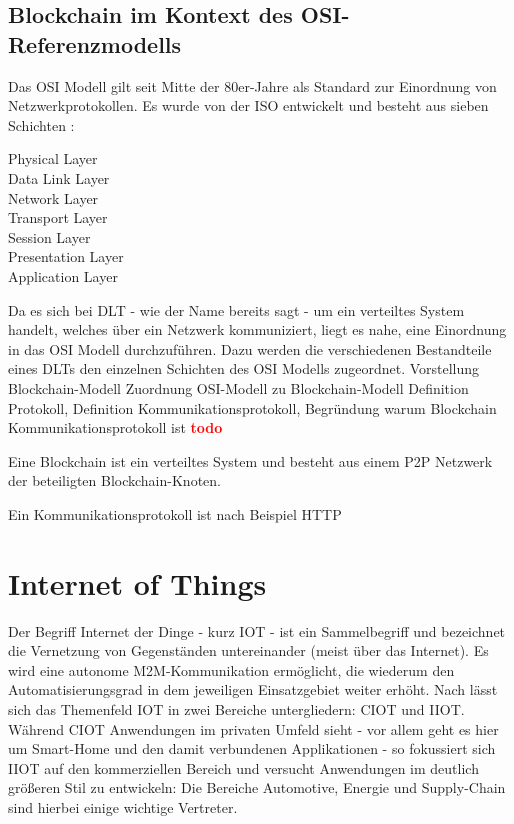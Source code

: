 \subsection{Blockchain im Kontext des OSI-Referenzmodells}
\label{subsec:fundamentals:dlt:osi}
Das \ac{OSI} Modell gilt seit Mitte der 80er-Jahre als Standard zur Einordnung von Netzwerkprotokollen. Es wurde von der \ac{ISO} entwickelt und besteht aus sieben Schichten \cite{OSI1980}:
\begin{description}
  \item[Physical Layer]
  \item[Data Link Layer]
  \item[Network Layer]
  \item[Transport Layer]
  \item[Session Layer]
  \item[Presentation Layer]
  \item[Application Layer]
\end{description}

Da es sich bei \ac{DLT} - wie der Name bereits sagt - um ein verteiltes System handelt, welches über ein Netzwerk kommuniziert, liegt es nahe, eine Einordnung in das \ac{OSI} Modell durchzuführen. Dazu werden die verschiedenen Bestandteile eines \ac{DLT}s den einzelnen Schichten des \ac{OSI} Modells zugeordnet.
  \cite{osi2014}
  Vorstellung Blockchain-Modell
  Zuordnung OSI-Modell zu Blockchain-Modell
  Definition Protokoll, Definition Kommunikationsprotokoll, Begründung warum Blockchain Kommunikationsprotokoll ist
  \textbf{\textcolor{red}{todo}}

Eine Blockchain ist ein verteiltes System und besteht aus einem \ac{P2P} Netzwerk der beteiligten Blockchain-Knoten.

Ein Kommunikationsprotokoll ist nach
Beispiel HTTP

%
%
\section{Internet of Things}
\label{sec:fundamentals:iot}
Der Begriff Internet der Dinge - kurz IOT - ist ein Sammelbegriff und bezeichnet die Vernetzung von Gegenständen untereinander (meist über das Internet). Es wird eine autonome \ac{M2M}-Kommunikation ermöglicht, die wiederum den Automatisierungsgrad in dem jeweiligen Einsatzgebiet weiter erhöht. Nach \cite{deloitte2018} lässt sich das Themenfeld \ac{IOT} in zwei Bereiche untergliedern: \ac{CIOT} und \ac{IIOT}. Während \ac{CIOT} Anwendungen im privaten Umfeld sieht - vor allem geht es hier um Smart-Home und den damit verbundenen Applikationen - so fokussiert sich \ac{IIOT} auf den kommerziellen Bereich und versucht Anwendungen im deutlich größeren Stil zu entwickeln: Die Bereiche Automotive, Energie und Supply-Chain sind hierbei einige wichtige Vertreter.\\


